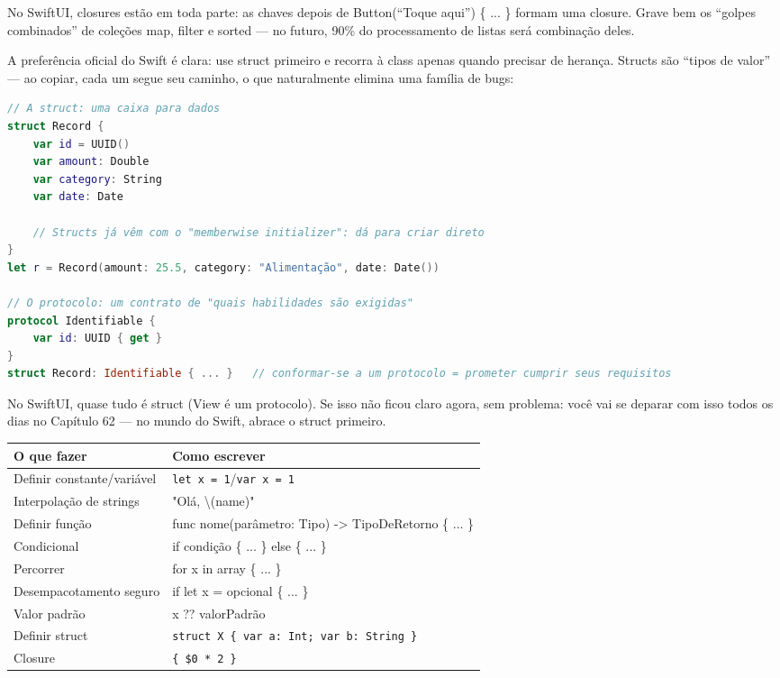 No SwiftUI, closures estão em toda parte: as chaves depois de Button(“Toque aqui”) \{ ... \} formam uma closure. Grave bem os “golpes combinados” de coleções map, filter e sorted — no futuro, 90\% do processamento de listas será combinação deles.


A preferência oficial do Swift é clara: use struct primeiro e recorra à class apenas quando precisar de herança. Structs são “tipos de valor” — ao copiar, cada um segue seu caminho, o que naturalmente elimina uma família de bugs:

\begin{lstlisting}[language=Swift]
// A struct: uma caixa para dados
struct Record {
    var id = UUID()
    var amount: Double
    var category: String
    var date: Date

    // Structs já vêm com o "memberwise initializer": dá para criar direto
}
let r = Record(amount: 25.5, category: "Alimentação", date: Date())

// O protocolo: um contrato de "quais habilidades são exigidas"
protocol Identifiable {
    var id: UUID { get }
}
struct Record: Identifiable { ... }   // conformar-se a um protocolo = prometer cumprir seus requisitos
\end{lstlisting}

No SwiftUI, quase tudo é struct (View é um protocolo). Se isso não ficou claro agora, sem problema: você vai se deparar com isso todos os dias no Capítulo 62 — no mundo do Swift, abrace o struct primeiro.


\begin{center}
\begin{tabularx}{\linewidth}{|X|X|}
\hline
\textbf{O que fazer} & \textbf{Como escrever} \tabularnewline
\hline
Definir constante/variável & \texttt{let x = 1}/\texttt{var x = 1} \tabularnewline
Interpolação de strings & "Olá, \textbackslash{}(name)" \tabularnewline
Definir função & func nome(parâmetro: Tipo) -> TipoDeRetorno \{ ... \} \tabularnewline
Condicional & if condição \{ ... \} else \{ ... \} \tabularnewline
Percorrer & for x in array \{ ... \} \tabularnewline
Desempacotamento seguro & if let x = opcional \{ ... \} \tabularnewline
Valor padrão & x ?? valorPadrão \tabularnewline
Definir struct & \texttt{struct X \{ var a: Int; var b: String \}} \tabularnewline
Closure & \texttt{\{ \$0 * 2 \}} \tabularnewline
\hline
\end{tabularx}
\end{center}

